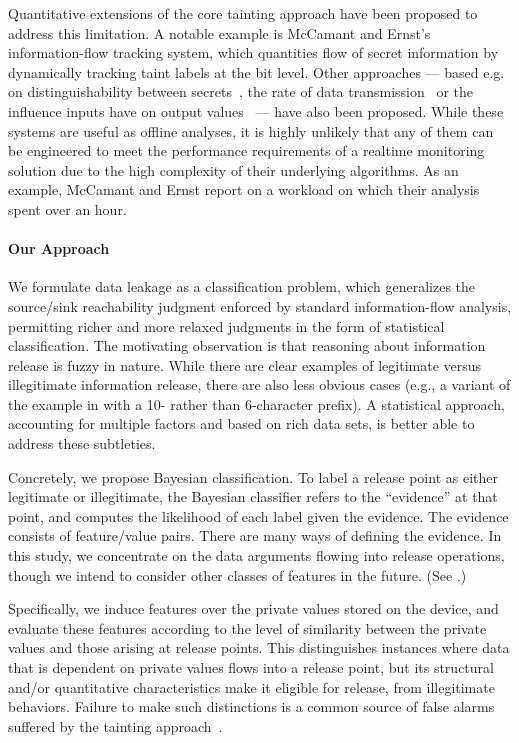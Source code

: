 Quantitative extensions of the core tainting approach have been proposed to address this limitation. A notable example is McCamant and Ernst's~\cite{ME:PLDI08} information-flow tracking system, which quantities flow of secret information by dynamically tracking taint labels at the bit level. Other approaches --- based e.g. on distinguishability between secrets~\cite{BKR:SP09}, the rate of data transmission~\cite{L:CSFW02} or the influence inputs have on output values~\cite{NMS:PLAS09} --- have also been proposed. While these systems are useful as offline analyses, it is highly unlikely that any of them can be engineered to meet the performance requirements of a realtime monitoring solution due to the high complexity of their underlying algorithms. As an example, McCamant and Ernst report on a workload on which their analysis spent over an hour.

\paragraph{Our Approach} We formulate data leakage as a classification problem, which generalizes the source/sink reachability judgment enforced by standard information-flow analysis, permitting richer and more relaxed judgments in the form of statistical classification. The motivating observation is that reasoning about information release is fuzzy in nature. While there are clear examples of legitimate versus illegitimate information release, there are also less obvious cases (e.g., a variant of the example in  with a 10- rather than 6-character prefix). A statistical approach, accounting for multiple factors and based on rich data sets, is better able to address these subtleties.

Concretely, we propose Bayesian classification. To label a release point as either legitimate or illegitimate, the Bayesian classifier refers to the ``evidence'' at that point, and computes the likelihood of each label given the evidence. The evidence consists of feature/value pairs.
%
There are many ways of defining the evidence. In this study, we concentrate on the data arguments flowing into release operations, though we intend to consider other classes of features in the future. (See .)

Specifically, we induce features over the private values stored on the device, and evaluate these features according to the level of similarity between the private values and those arising at release points. This distinguishes instances where data that is dependent on private values flows into a release point, but its structural and/or quantitative characteristics make it eligible for release, from illegitimate behaviors. Failure to make such distinctions is a common source of false alarms suffered by the tainting approach~\cite{EGCCJMS:OSDI10}.


